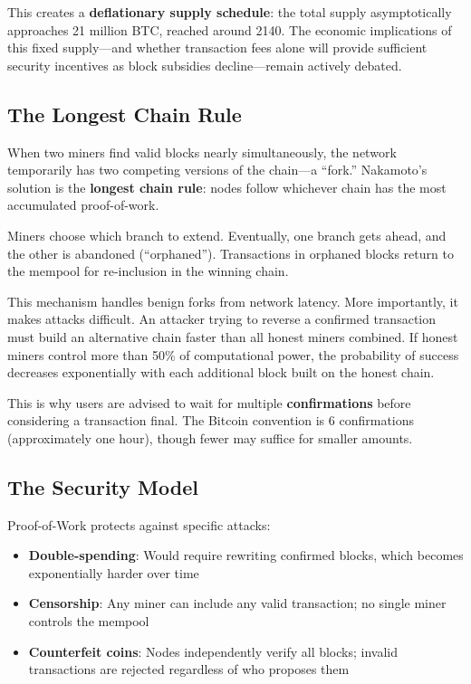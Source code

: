 \documentclass[11pt,a4paper]{article}
\newcommand{\keyword}[1]{\textbf{\textcolor{AccentOrange}{#1}}}
\begin{document}
This creates a \keyword{deflationary supply schedule}: the total supply asymptotically approaches 21 million BTC, reached around 2140. The economic implications of this fixed supply---and whether transaction fees alone will provide sufficient security incentives as block subsidies decline---remain actively debated.

\subsection{The Longest Chain Rule}

When two miners find valid blocks nearly simultaneously, the network temporarily has two competing versions of the chain---a ``fork.'' Nakamoto's solution is the \keyword{longest chain rule}: nodes follow whichever chain has the most accumulated proof-of-work.

Miners choose which branch to extend. Eventually, one branch gets ahead, and the other is abandoned (``orphaned''). Transactions in orphaned blocks return to the mempool for re-inclusion in the winning chain.

This mechanism handles benign forks from network latency. More importantly, it makes attacks difficult. An attacker trying to reverse a confirmed transaction must build an alternative chain faster than all honest miners combined. If honest miners control more than 50\% of computational power, the probability of success decreases exponentially with each additional block built on the honest chain.

This is why users are advised to wait for multiple \keyword{confirmations} before considering a transaction final. The Bitcoin convention is 6 confirmations (approximately one hour), though fewer may suffice for smaller amounts.

\subsection{The Security Model}

Proof-of-Work protects against specific attacks:

\begin{itemize}
    \item \textbf{Double-spending}: Would require rewriting confirmed blocks, which becomes exponentially harder over time
    \item \textbf{Censorship}: Any miner can include any valid transaction; no single miner controls the mempool
    \item \textbf{Counterfeit coins}: Nodes independently verify all blocks; invalid transactions are rejected regardless of who proposes them
\end{itemize}
\end{document}
